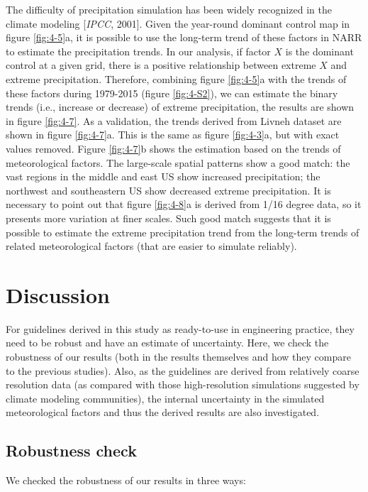 The difficulty of precipitation simulation has been widely recognized in the climate modeling [\textit{IPCC}, 2001]. Given the year-round dominant control map in figure \ref{fig:4-5}a, it is possible to use the long-term trend of these factors in NARR to estimate the precipitation trends. In our analysis, if factor $X$ is the dominant control at a given grid, there is a positive relationship between extreme $X$ and extreme precipitation. Therefore, combining figure \ref{fig:4-5}a with the trends of these factors during 1979-2015 (figure \ref{fig:4-S2}), we can estimate the binary trends (i.e., increase or decrease) of extreme precipitation, the results are shown in figure \ref{fig:4-7}. As a validation, the trends derived from Livneh dataset are shown in figure \ref{fig:4-7}a. This is the same as figure \ref{fig:4-3}a, but with exact values removed. Figure \ref{fig:4-7}b shows the estimation based on the trends of meteorological factors. The large-scale spatial patterns show a good match: the vast regions in the middle and east US show increased precipitation; the northwest and southeastern US show decreased extreme precipitation. It is necessary to point out that figure \ref{fig:4-8}a is derived from 1/16 degree data, so it presents more variation at finer scales. Such good match suggests that it is possible to estimate the extreme precipitation trend from the long-term trends of related meteorological factors (that are easier to simulate reliably).

\section{Discussion}

For guidelines derived in this study as ready-to-use in engineering practice, they need to be robust and have an estimate of uncertainty. Here, we check the robustness of our results (both in the results themselves and how they compare to the previous studies). Also, as the guidelines are derived from relatively coarse resolution data (as compared with those high-resolution simulations suggested by climate modeling communities), the internal uncertainty in the simulated meteorological factors and thus the derived results are also investigated.

\subsection{Robustness check}

We checked the robustness of our results in three ways:

